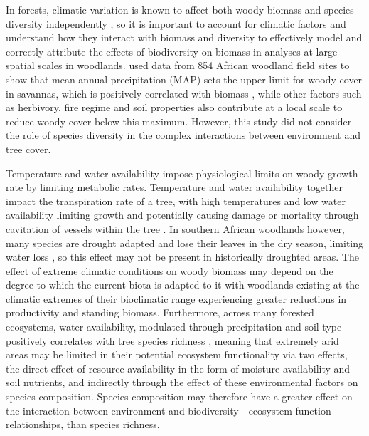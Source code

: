 \documentclass[11pt,a4paper]{article}
\begin{document}

In forests, climatic variation is known to affect both woody biomass \citep{Michaletz2014, Michaletz2018} and species diversity independently \citep{Spasojevic2014}, so it is important to account for climatic factors and understand how they interact with biomass and diversity to effectively model and correctly attribute the effects of biodiversity on biomass in analyses at large spatial scales in woodlands. \citet{Sankaran2005} used data from 854 African woodland field sites to show that mean annual precipitation (MAP) sets the upper limit for woody cover in savannas, which is positively correlated with biomass \citep{Chisholm2013, Prado-Junior2016}, while other factors such as herbivory, fire regime and soil properties also contribute at a local scale to reduce woody cover below this maximum. However, this study did not consider the role of species diversity in the complex interactions between environment and tree cover. 

Temperature and water availability impose physiological limits on woody growth rate by limiting metabolic rates. Temperature and water availability together impact the transpiration rate of a tree, with high temperatures and low water availability limiting growth and potentially causing damage or mortality through cavitation of vessels within the tree \citep{Rowland2015a, Fensham2009}. In southern African woodlands however, many species are drought adapted and lose their leaves in the dry season, limiting water loss \citep{Solbrig1996}, so this effect may not be present in historically droughted areas. The effect of extreme climatic conditions on woody biomass may depend on the degree to which the current biota is adapted to it with woodlands existing at the climatic extremes of their bioclimatic range experiencing greater reductions in productivity and standing biomass. Furthermore, across many forested ecosystems, water availability, modulated through precipitation and soil type positively correlates with tree species richness \citep{Vila2005}, meaning that extremely arid areas may be limited in their potential ecosystem functionality via two effects, the direct effect of resource availability in the form of moisture availability and soil nutrients, and indirectly through the effect of these environmental factors on species composition. Species composition may therefore have a greater effect on the interaction between environment and biodiversity - ecosystem function relationships, than species richness. 
\end{document}
